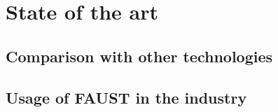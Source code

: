 \chapter{State of the art}
\section {Comparison with other technologies}
\section {Usage of FAUST in the industry}